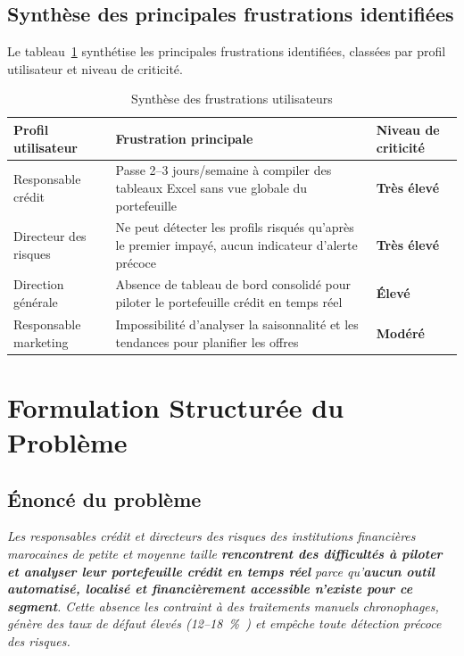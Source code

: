 \documentclass[12pt, a4paper]{report}
\begin{document}
\subsection{Synthèse des principales frustrations identifiées}

Le tableau~\ref{tab:frustrations} synthétise les principales frustrations identifiées,
classées par profil utilisateur et niveau de criticité.

\begin{table}[H]
\centering
\caption{Synthèse des frustrations utilisateurs}
\label{tab:frustrations}
\renewcommand{\arraystretch}{1.4}
\begin{tabularx}{\textwidth}{p{3.5cm} X p{2.8cm}}
\toprule
\rowcolor{primary!12}
Profil utilisateur & Frustration principale & Niveau de criticité \\
\midrule
Responsable crédit
  & Passe 2--3 jours/semaine à compiler des tableaux Excel sans vue globale du portefeuille
  & \textcolor{dangercolor}{\textbf{Très élevé}} \\
\midrule
Directeur des risques
  & Ne peut détecter les profils risqués qu'après le premier impayé, aucun indicateur d'alerte précoce
  & \textcolor{dangercolor}{\textbf{Très élevé}} \\
\midrule
Direction générale
  & Absence de tableau de bord consolidé pour piloter le portefeuille crédit en temps réel
  & \textcolor{secondary}{\textbf{Élevé}} \\
\midrule
Responsable marketing
  & Impossibilité d'analyser la saisonnalité et les tendances pour planifier les offres
  & \textcolor{secondary}{\textbf{Modéré}} \\
\bottomrule
\end{tabularx}
\end{table}

\section{Formulation Structurée du Problème}

\subsection{Énoncé du problème}

\begin{tcolorbox}[problembox,title={Formulation structurée du problème}]
\textit{Les responsables crédit et directeurs des risques des institutions financières
marocaines de petite et moyenne taille \textbf{rencontrent des difficultés à piloter
et analyser leur portefeuille crédit en temps réel} parce qu'\textbf{aucun outil
automatisé, localisé et financièrement accessible n'existe pour ce segment}.
Cette absence les contraint à des traitements manuels chronophages, génère des taux de
défaut élevés (12--18~\%~\cite{bam_rapport,fnam}) et empêche toute détection
précoce des risques.}
\end{tcolorbox}
\end{document}
